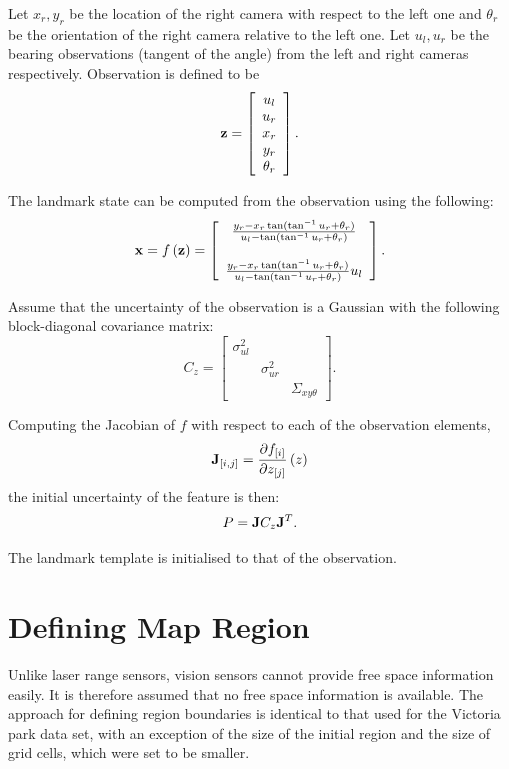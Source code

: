 Let $x_r,y_r$ be the location of the right camera with respect to the
left one and $\theta_r$ be the orientation of the right camera
relative to the left one. Let $u_l,u_r$ be the bearing observations
(tangent of the angle) from the left and right cameras
respectively. Observation is defined to be
$$
{\bf z} =  \left[
    \begin{array}{c}
       u_l\\u_r\\x_r\\y_r\\\theta_r
    \end{array}
\right].
$$

The landmark state can be computed from the observation using the
following:
$$
{\bf x} = f\left({\bf z}\right) 
= \left[\begin{array}{c}
\frac{y_r - x_r\tan(\tan^{-1} u_r+\theta_r)}{u_l-\tan(\tan^{-1} u_r+\theta_r) }\\
{}\\
\frac{y_r - x_r\tan(\tan^{-1} u_r+\theta_r)}{u_l-\tan(\tan^{-1} u_r+\theta_r)}u_l
\end{array}
\right].
$$

Assume that the uncertainty of the observation is a Gaussian with
the following block-diagonal covariance matrix:
$$
C_z = \left[
  \begin{array}{ccc}
    \sigma^2_{ul} &             & \\
                & \sigma^2_{ur} & \\
                &             & \Sigma_{xy\theta}
  \end{array}
\right].
$$

Computing the Jacobian of $f$ with respect to each of the
observation elements,
$$
{\bf J}_{[i,j]} = \frac{\partial f_{[i]}}
{\partial z_{[j]}}\left(z \right)
$$
the initial uncertainty of the feature is then:
$$
P = {\bf J} C_z {\bf J}^T.
$$

The landmark template is initialised to that of the observation.

\section{Defining Map Region}

Unlike laser range sensors, vision sensors cannot provide free space
information easily. It is therefore assumed that no free space
information is available. The approach for defining region boundaries
is identical to that used for the Victoria park data set, with an
exception of the size of the initial region and the size of grid
cells, which were set to be smaller.

